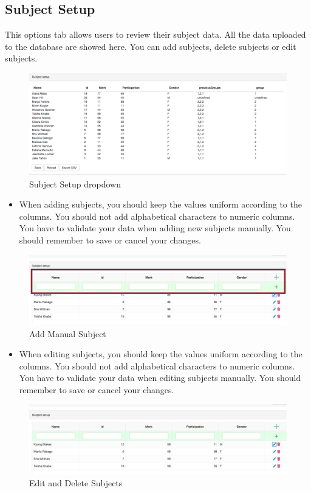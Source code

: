 \subsection{Subject Setup}\par
This options tab allows users to review their subject data. All the data uploaded to the database are showed here. You can add subjects, delete subjects or edit subjects.\par
 \begin{figure}[H] 
	\centering
	\includegraphics[width=13cm]{./graphics/SubjectSetup.jpg}\par
	\caption{Subject Setup dropdown}
\end{figure}
\begin{itemize}
\item When adding subjects, you should keep the values uniform according to the columns. You should not add alphabetical characters to numeric columns. You have to validate your data when adding new subjects manually. You should remember to save or cancel your changes.
\end{itemize}
\begin{figure}[H] 
	\centering
	\includegraphics[width=13cm]{./graphics/AddManualSubject.jpg}\par
	\caption{Add Manual Subject}
\end{figure}
\begin{itemize}
\item When editing subjects, you should keep the values uniform according to the columns. You should not add alphabetical characters to numeric columns. You have to validate your data when editing subjects manually. You should remember to save or cancel your changes.
\end{itemize}
 \begin{figure}[H] 
	\centering
	\includegraphics[width=13cm]{./graphics/EditAndDeleteSubject.jpg}\par
	\caption{Edit and Delete Subjects}
\end{figure}

